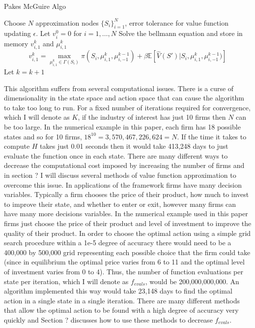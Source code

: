 \documentclass[12pt]{article}
\newcommand{\norm}[1]{\left\lVert#1\right\rVert}
\begin{document}
\begin{algorithm}[H]
  \caption{Pakes McGuire Algo}
  \begin{algorithmic}[1]
    \Procedure{}{} Choose $N$ approximation nodes $\{S_i\}_{i=1}^N$, error tolerance for value function updating $\epsilon$.
    \State Let $v^0_i=0$ for $i=1,\dots,N$
    \While{$\norm{v^{k}_1-v^{k-1}_1} > \frac{\epsilon (1-\beta)}{2\beta}$}
    \State Solve the bellmann equation and store in memory $v^k_{i,1}$ and $\mu^k_{i,1}$
    \begin{equation*}
      v^k_{i,1}=\max_{\mu^k_{i,1} \in \Gamma(S_i)} \pi(S_i, \mu^k_{i,1}, \mu^{k-1}_{i,-1})+ \beta\mathbb{E}[\hat{V}(S')|S_i,\mu^k_{i,1},\mu^{k-1}_{i,-1})]
    \end{equation*}
    \State Let $k=k+1$
    \EndFor
    \EndWhile
    \EndProcedure
  \end{algorithmic}
\end{algorithm}

This algorithm suffers from several computational issues. There is a curse of dimensionality in the state space and action space that can cause the algorithm to take too long to run. For a fixed number of iterations required for convergence, which I will denote as $K$, if the industry of interest has just 10 firms then $N$ can be too large. In the numerical example in this paper, each firm has 18 possible states and so for 10 firms, $18^{10}=3,570,467,226,624=N$. If the time it takes to compute $H$ takes just 0.01 seconds then it would take 413,248 days to just evaluate the function once in each state. There are many different ways to decrease the computational cost imposed by increasing the number of firms and in section ? I will discuss several methods of value function approximation to overcome this issue. In applications of the \citet{1995_Erickson_Pakes_RES} framework firms have many decision variables. Typically a firm chooses the price of their product, how much to invest to improve their state, and whether to enter or exit, however many firms can have many more decisions variables. In the numerical example used in this paper firms just choose the price of their product and level of investment to improve the quality of their product. In order to choose the optimal action using a simple grid search procedure within a 1e-5 degree of accuracy there would need to be a 400,000 by 500,000 grid representing each possible choice that the firm could take (since in equilibrium the optimal price varies from 6 to 11 and the optimal level of investment varies from 0 to 4). Thus, the number of function evaluations per state per iteration, which I will denote as $f_{evals}$, would be 200,000,000,000. An algorithm implemented this way would take 23,148 days to find the optimal action in a single state in a single iteration. There are many different methods that allow the optimal action to be found with a high degree of accuracy very quickly and Section ? discusses how to use these methods to decrease $f_{evals}$.
\end{document}
